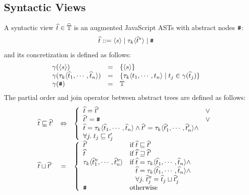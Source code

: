 \subsection{Syntactic Views} A syntactic view $\widehat{t} \in \widehat{\mathbb{T}}$ is an
augmented JavaScript ASTs with abstract nodes $\texttt{\#}$:
\[
  \widehat{t} ::= \langle s \rangle \mid \tau_k \langle \widehat{t}^* \rangle \mid \texttt{\#}
\]
and its concretization is defined as follows:
\[
  \begin{array}{lcl}
    \gamma(\langle s \rangle) &=&
    \{ \langle s \rangle \}\\

    \gamma(\tau_k \langle \widehat{t}_1, \cdots, \widehat{t}_n \rangle) &=&
    \{ \tau_k \langle t_1, \cdots, t_n \rangle \mid t_j \in
    \gamma(\widehat{t}_j) \}\\

    \gamma(\texttt{\#}) &=& \mathbb{T}\\
  \end{array}
\]
The partial order and join operator between abstract trees are defined as
follows:
\[
  \begin{array}{lcl}
    \atree \order \atree' &\Leftrightarrow& \left\{
      \begin{array}{ll}
        \atree = \atree' &\vee\\

        \atree' = \treetop &\vee\\

        \begin{array}{@{}l@{}}
          \atree = \ty_k \langle \atree_1, \cdots, \atree_n \rangle \wedge
          \atree' = \ty_k \langle \atree'_1, \cdots, \atree'_n \rangle \wedge\\
          \forall j. \; \tree_j \order \tree'_j\\
        \end{array}\\
      \end{array}
    \right.\\

    \atree \join \atree' &=& \left\{
      \begin{array}{ll}
        \atree' & \text{if} \; \atree \order \atree'\\

        \atree & \text{if} \; \atree \revorder \atree'\\

        \ty_k \langle \atree''_1, \cdots, \atree''_n \rangle &
        \text{if} \; \atree = \ty_k \langle \atree_1, \cdots, \atree_n \rangle
        \wedge\\&
        \phantom{\text{if} \;} \atree = \ty_k \langle \atree_1, \cdots, \atree_n
        \rangle \wedge\\&
        \phantom{\text{if} \;} \forall j. \; \atree''_j = \atree_j
        \join \atree'_j\\
        \treetop & \text{otherwise}\\
      \end{array}
    \right.\\
  \end{array}
\]
